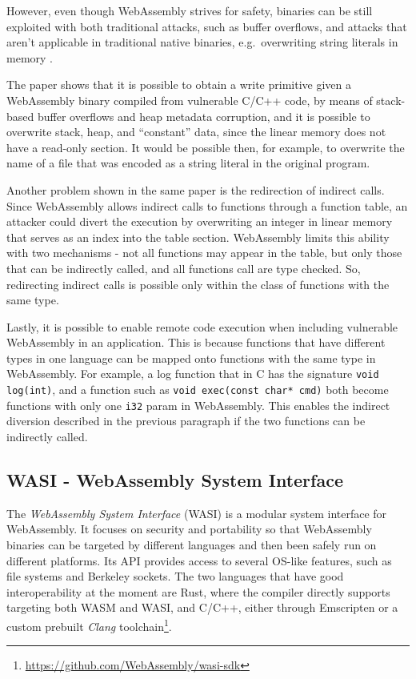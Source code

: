 However, even though WebAssembly strives for safety, binaries can be still exploited with both traditional attacks,
such as buffer overflows, and attacks that aren't applicable in traditional native binaries, e.g.\ overwriting
string literals in memory \cite{binary-security-wasm-2020}.

The paper shows that it is possible to obtain a write primitive given a WebAssembly binary compiled from vulnerable C/C++ code,
by means of stack-based buffer overflows and heap metadata corruption, and it is possible to overwrite stack, heap, and ``constant''
data, since the linear memory does not have a read-only section. It would be possible then, for example, to overwrite the name
of a file that was encoded as a string literal in the original program.

Another problem shown in the same paper is the redirection of indirect calls. Since WebAssembly allows indirect calls
to functions through a function table, an attacker could divert the execution by overwriting an integer in linear memory
that serves as an index into the table section. WebAssembly limits this ability with two mechanisms - not all functions
may appear in the table, but only those that can be indirectly called, and all functions call are type checked.
So, redirecting indirect calls is possible only within the class of functions with the same type.

Lastly, it is possible to enable remote code execution when including vulnerable WebAssembly in an application.
This is because functions that have different types in one language can be mapped onto functions with the same type
in WebAssembly. For example, a log function that in C has the signature \texttt{void log(int)}, and a function such as
\texttt{void exec(const char* cmd)} both become functions with only one \texttt{i32} param in WebAssembly.
This enables the indirect diversion described in the previous paragraph if the two functions can be indirectly called.

\subsection{WASI - WebAssembly System Interface}
\label{sec:introduction-wasi}

The \textit{WebAssembly System Interface} (WASI) \cite{wasi} is a modular system interface for WebAssembly.
It focuses on security and portability so that WebAssembly binaries can be targeted by different languages
and then been safely run on different platforms.
Its API provides access to several OS-like features, such as file systems and Berkeley sockets.
The two languages that have good interoperability at the moment are Rust, where the compiler directly supports targeting both WASM and WASI,
and C/C++, either through Emscripten or a custom prebuilt \textit{Clang} toolchain\footnote{\url{https://github.com/WebAssembly/wasi-sdk}}.

